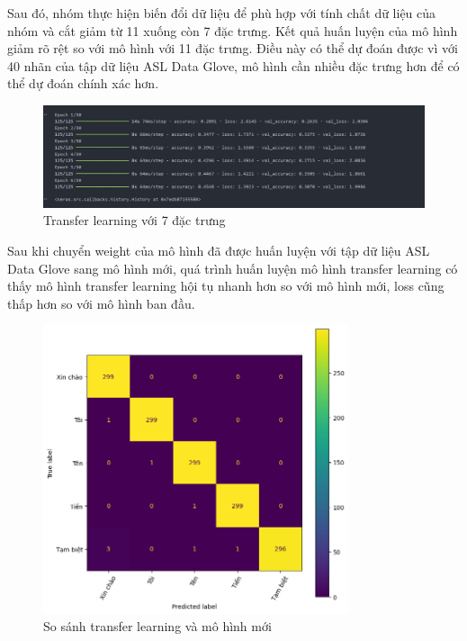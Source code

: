 Sau đó, nhóm thực hiện biến đổi dữ liệu để phù hợp với tính chất dữ liệu của nhóm và cắt giảm từ 11 xuống còn 7 đặc trưng. Kết quả huấn luyện của mô hình giảm rõ rệt so với mô hình với 11 đặc trưng. Điều này có thể dự đoán được vì với 40 nhãn của tập dữ liệu ASL Data Glove, mô hình cần nhiều đặc trưng hơn để có thể dự đoán chính xác hơn.

\begin{figure}[H]
    \centering
    \includegraphics[width=1.1\textwidth]{Images/Improvement results/transfer_learning_training_result.png}
    \caption{Transfer learning với 7 đặc trưng}
    \label{fig:transfer_learning_training_result_7_class}
\end{figure}

Sau khi chuyển weight của mô hình đã được huấn luyện với tập dữ liệu ASL Data Glove sang mô hình mới, quá trình huấn luyện mô hình transfer learning có thấy mô hình transfer learning hội tụ nhanh hơn so với mô hình mới, loss cũng thấp hơn so với mô hình ban đầu. 

\begin{figure}[H]
    \centering
    \includegraphics[width=0.8\textwidth]{Images/Improvement results/transfer_learning_confusion_matrix.png}
    \caption{So sánh transfer learning và mô hình mới}
    \label{fig:transfer_learning_training_result_compare}
\end{figure}

